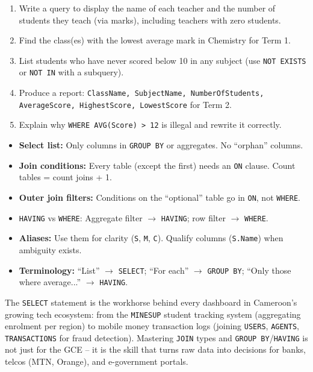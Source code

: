 \documentclass[11pt]{article}
\begin{document}
\begin{exercice}
\begin{enumerate}
\item Write a query to display the name of each teacher and the number of students they teach (via marks), including teachers with zero students.
\item Find the class(es) with the lowest average mark in Chemistry for Term 1.
\item List students who have never scored below 10 in any subject (use \texttt{NOT EXISTS} or \texttt{NOT IN} with a subquery).
\item Produce a report: \texttt{ClassName, SubjectName, NumberOfStudents, AverageScore, HighestScore, LowestScore} for Term 2.
\item Explain why \texttt{WHERE AVG(Score) > 12} is illegal and rewrite it correctly.
\end{enumerate}
\end{exercice}

\begin{aretenir}
\begin{itemize}
\item \textbf{Select list:} Only columns in \texttt{GROUP BY} or aggregates. No ``orphan'' columns.
\item \textbf{Join conditions:} Every table (except the first) needs an \texttt{ON} clause. Count tables = count joins + 1.
\item \textbf{Outer join filters:} Conditions on the ``optional'' table go in \texttt{ON}, not \texttt{WHERE}.
\item \texttt{HAVING} vs \texttt{WHERE}: Aggregate filter $\rightarrow$ \texttt{HAVING}; row filter $\rightarrow$ \texttt{WHERE}.
\item \textbf{Aliases:} Use them for clarity (\texttt{S}, \texttt{M}, \texttt{C}). Qualify columns (\texttt{S.Name}) when ambiguity exists.
\item \textbf{Terminology:} ``List'' $\rightarrow$ \texttt{SELECT}; ``For each'' $\rightarrow$ \texttt{GROUP BY}; ``Only those where average...'' $\rightarrow$ \texttt{HAVING}.
\end{itemize}
\end{aretenir}

\begin{savaistu}
The \texttt{SELECT} statement is the workhorse behind every dashboard in Cameroon's growing tech ecosystem: from the \texttt{MINESUP} student tracking system (aggregating enrolment per region) to mobile money transaction logs (joining \texttt{USERS}, \texttt{AGENTS}, \texttt{TRANSACTIONS} for fraud detection). Mastering \texttt{JOIN} types and \texttt{GROUP BY}/\texttt{HAVING} is not just for the GCE -- it is the skill that turns raw data into decisions for banks, telcos (MTN, Orange), and e-government portals.
\end{savaistu}
\end{document}
